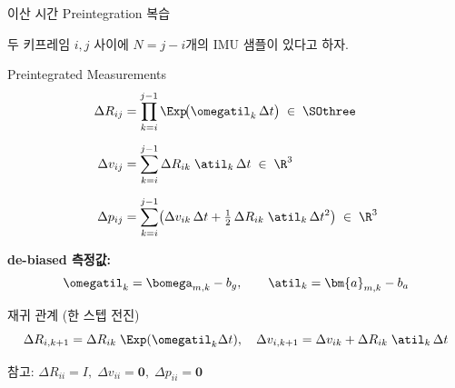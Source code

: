 
\begin{frame}[shrink=10]{이산 시간 Preintegration 복습}

  두 키프레임 $i,j$ 사이에 $N = j - i$개의 IMU 샘플이 있다고 하자.

  \begin{block}{Preintegrated Measurements}
    \begin{align*}
      \Delta R_{ij}
        &= \prod_{k=i}^{j-1}\Exp\!\bigl(\omegatil_k\,\Delta t\bigr)
        \;\in\;\SOthree \\[6pt]
      \Delta v_{ij}
        &= \sum_{k=i}^{j-1}\Delta R_{ik}\;\atil_k\,\Delta t
        \;\in\;\R^3 \\[6pt]
      \Delta p_{ij}
        &= \sum_{k=i}^{j-1}\!\left(\Delta v_{ik}\,\Delta t
            + \tfrac{1}{2}\,\Delta R_{ik}\;\atil_k\,\Delta t^2\right)
        \;\in\;\R^3
    \end{align*}
  \end{block}

  \pause
  \vspace{0.3em}
  \textbf{de-biased 측정값:}
  \[
    \omegatil_k = \bomega_{m,k} - b_g,
    \qquad
    \atil_k = \bm{a}_{m,k} - b_a
  \]

  \pause
  \begin{exampleblock}{재귀 관계 (한 스텝 전진)}
    \[
      \Delta R_{i,k+1} = \Delta R_{ik}\;\Exp(\omegatil_k\Delta t),
      \quad
      \Delta v_{i,k+1} = \Delta v_{ik} + \Delta R_{ik}\;\atil_k\,\Delta t
    \]
  \end{exampleblock}

  \vspace{0.2em}
  \footnotesize 참고: $\Delta R_{ii} = I,\; \Delta v_{ii} = \bm{0},\; \Delta p_{ii} = \bm{0}$
\end{frame}


